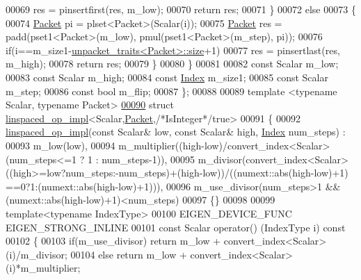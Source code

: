 \begin{DoxyCode}
00069         res = pinsertfirst(res, m\_low);
00070       \textcolor{keywordflow}{return} res;
00071     \}
00072     \textcolor{keywordflow}{else}
00073     \{
00074       \hyperlink{union_eigen_1_1internal_1_1_packet}{Packet} pi = plset<Packet>(Scalar(i));
00075       \hyperlink{union_eigen_1_1internal_1_1_packet}{Packet} res = padd(pset1<Packet>(m\_low), pmul(pset1<Packet>(m\_step), pi));
00076       \textcolor{keywordflow}{if}(i==m\_size1-\hyperlink{struct_eigen_1_1internal_1_1unpacket__traits}{unpacket\_traits<Packet>::size}+1)
00077         res = pinsertlast(res, m\_high);
00078       \textcolor{keywordflow}{return} res;
00079     \}
00080   \}
00081 
00082   \textcolor{keyword}{const} Scalar m\_low;
00083   \textcolor{keyword}{const} Scalar m\_high;
00084   \textcolor{keyword}{const} \hyperlink{namespace_eigen_a62e77e0933482dafde8fe197d9a2cfde}{Index} m\_size1;
00085   \textcolor{keyword}{const} Scalar m\_step;
00086   \textcolor{keyword}{const} \textcolor{keywordtype}{bool} m\_flip;
00087 \};
00088 
00089 \textcolor{keyword}{template} <\textcolor{keyword}{typename} Scalar, \textcolor{keyword}{typename} Packet>
\hyperlink{struct_eigen_1_1internal_1_1linspaced__op__impl_3_01_scalar_00_01_packet_00_01true_01_4}{00090} \textcolor{keyword}{struct }\hyperlink{struct_eigen_1_1internal_1_1linspaced__op__impl}{linspaced\_op\_impl}<Scalar,\hyperlink{union_eigen_1_1internal_1_1_packet}{Packet},\textcolor{comment}{/*IsInteger*/}true>
00091 \{
00092   \hyperlink{struct_eigen_1_1internal_1_1linspaced__op__impl}{linspaced\_op\_impl}(\textcolor{keyword}{const} Scalar& low, \textcolor{keyword}{const} Scalar& high, 
      \hyperlink{namespace_eigen_a62e77e0933482dafde8fe197d9a2cfde}{Index} num\_steps) :
00093     m\_low(low),
00094     m\_multiplier((high-low)/convert\_index<Scalar>(num\_steps<=1 ? 1 : num\_steps-1)),
00095     m\_divisor(convert\_index<Scalar>((high>=low?num\_steps:-num\_steps)+(high-low))/((numext::abs(high-low)+1)
      ==0?1:(numext::abs(high-low)+1))),
00096     m\_use\_divisor(num\_steps>1 && (numext::abs(high-low)+1)<num\_steps)
00097   \{\}
00098 
00099   \textcolor{keyword}{template}<\textcolor{keyword}{typename} IndexType>
00100   EIGEN\_DEVICE\_FUNC EIGEN\_STRONG\_INLINE
00101   \textcolor{keyword}{const} Scalar operator() (IndexType i)\textcolor{keyword}{ const}
00102 \textcolor{keyword}{  }\{
00103     \textcolor{keywordflow}{if}(m\_use\_divisor) \textcolor{keywordflow}{return} m\_low + convert\_index<Scalar>(i)/m\_divisor;
00104     \textcolor{keywordflow}{else}              \textcolor{keywordflow}{return} m\_low + convert\_index<Scalar>(i)*m\_multiplier;

\end{DoxyCode}
